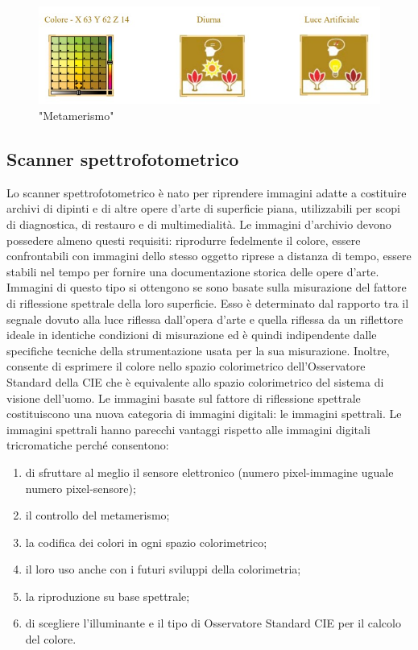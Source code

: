 \documentclass[a4paper,11pt]{article}
\begin{document}
        \begin{figure}[h]
        \centering
        \includegraphics[scale=0.8]{colorimetria2}
        \caption{"Metamerismo"}
        \end{figure}
        
        \newpage

        \subsection{Scanner spettrofotometrico}
        Lo scanner spettrofotometrico è nato per riprendere immagini adatte a
        costituire archivi di dipinti e di altre opere d’arte di superficie piana, utilizzabili per scopi di diagnostica, di
        restauro e di multimedialità. Le immagini d’archivio devono possedere almeno questi requisiti: riprodurre
        fedelmente il colore, essere confrontabili con immagini dello stesso oggetto riprese a distanza di tempo,
        essere stabili nel tempo per fornire una documentazione storica delle opere d’arte. Immagini di questo tipo si
        ottengono se sono basate sulla misurazione del fattore di riflessione spettrale della loro superficie. Esso è
        determinato dal rapporto tra il segnale dovuto alla luce riflessa dall’opera d’arte e quella riflessa da un
        riflettore ideale in identiche condizioni di misurazione ed è quindi indipendente dalle specifiche tecniche
        della strumentazione usata per la sua misurazione. Inoltre, consente di esprimere il colore nello spazio
        colorimetrico dell’Osservatore Standard della CIE che è equivalente allo spazio colorimetrico del sistema di
        visione dell’uomo. Le immagini basate sul fattore di riflessione spettrale costituiscono una nuova categoria di
        immagini digitali: le immagini spettrali.
        Le immagini spettrali hanno parecchi vantaggi rispetto alle immagini digitali tricromatiche perché consentono:
        \begin{enumerate} 
             \item di sfruttare al meglio il sensore elettronico (numero pixel-immagine uguale numero pixel-sensore);
             \item il controllo del metamerismo;
             \item la codifica dei colori in ogni spazio colorimetrico;
             \item il loro uso anche con i futuri sviluppi della colorimetria;
             \item la riproduzione su base spettrale;
             \item di scegliere l’illuminante e il tipo di Osservatore Standard CIE per il calcolo del colore.
        \end{enumerate}
\end{document}
